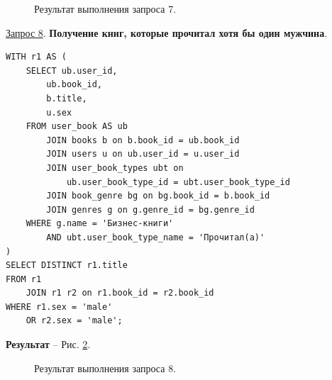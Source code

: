 \documentclass[a4paper,12pt]{article}
\begin{document}
\begin{figure}[ht]
    \caption{Результат выполнения запроса 7.}
    \label{fig:request7}
\end{figure}

\underline{Запрос 8}. \textbf{Получение книг, которые прочитал хотя бы один мужчина}.
\begin{lstlisting}
WITH r1 AS (
    SELECT ub.user_id,
        ub.book_id,
        b.title,
        u.sex
    FROM user_book AS ub
        JOIN books b on b.book_id = ub.book_id
        JOIN users u on ub.user_id = u.user_id
        JOIN user_book_types ubt on 
            ub.user_book_type_id = ubt.user_book_type_id
        JOIN book_genre bg on bg.book_id = b.book_id
        JOIN genres g on g.genre_id = bg.genre_id
    WHERE g.name = 'Бизнес-книги'
        AND ubt.user_book_type_name = 'Прочитал(а)'
)
SELECT DISTINCT r1.title
FROM r1
    JOIN r1 r2 on r1.book_id = r2.book_id
WHERE r1.sex = 'male'
    OR r2.sex = 'male';
    \end{lstlisting}

\textbf{Результат} -- Рис. \ref{fig:request8}.

\begin{figure}[ht]
    \caption{Результат выполнения запроса 8.}
    \label{fig:request8}
\end{figure}
\end{document}
